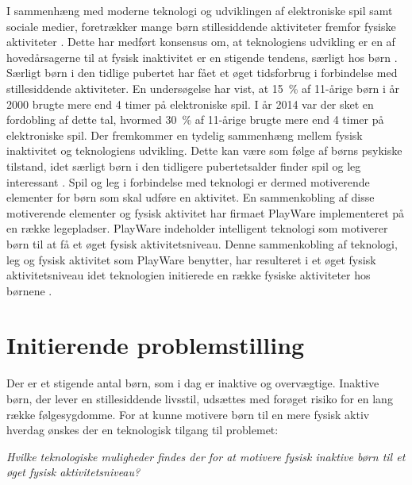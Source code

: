 I sammenhæng med moderne teknologi og udviklingen af elektroniske spil samt sociale medier, foretrækker mange børn stillesiddende aktiviteter fremfor fysiske aktiviteter \citep{Universitet2014}. Dette har medført konsensus om, at teknologiens udvikling er en af hovedårsagerne til at fysisk inaktivitet er en stigende tendens, særligt hos børn \citep{Kiens2007}. \newline
Særligt børn i den tidlige pubertet har fået et øget tidsforbrug i forbindelse med stillesiddende aktiviteter. En undersøgelse har vist, at 15~\% af 11-årige børn i år 2000 brugte mere end 4 timer på elektroniske spil. I år 2014 var der sket en fordobling af dette tal, hvormed 30~\% af 11-årige brugte mere end 4 timer på elektroniske spil. \citep{Universitet2014} \newline
Der fremkommer en tydelig sammenhæng mellem fysisk inaktivitet og teknologiens udvikling. Dette kan være som følge af børns psykiske tilstand, idet særligt børn i den tidligere pubertetsalder finder spil og leg interessant \citep{Wied2011}. Spil og leg i forbindelse med teknologi er dermed motiverende elementer for børn som skal udføre en aktivitet. En sammenkobling af disse motiverende elementer og fysisk aktivitet har firmaet PlayWare implementeret på en række legepladser. PlayWare indeholder intelligent teknologi som motiverer børn til at få et øget fysisk aktivitetsniveau. Denne sammenkobling af teknologi, leg og fysisk aktivitet som PlayWare benytter, har resulteret i et øget fysisk aktivitetsniveau idet teknologien initierede en række fysiske aktiviteter hos børnene \citep{Rishoej2010}. 

\section{Initierende problemstilling}
Der er et stigende antal børn, som i dag er inaktive og overvægtige. Inaktive børn, der lever en stillesiddende livsstil, udsættes med forøget risiko for en lang række følgesygdomme. For at kunne motivere børn til en mere fysisk aktiv hverdag ønskes der en teknologisk tilgang til problemet:

\begin{center}
\textit{Hvilke teknologiske muligheder findes der for at motivere fysisk inaktive børn til et øget fysisk aktivitetsniveau?}
\end{center}